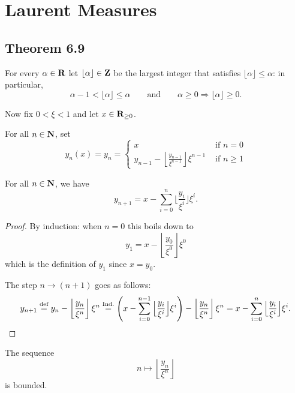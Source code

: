\section{Laurent Measures}
\subsection{Theorem 6.9}

For every $\alpha\in\mathbf{R}$ let $\lfloor \alpha\rfloor\in\mathbf{Z}$ be the largest integer that satisfies $\lfloor \alpha\rfloor\le \alpha$: in particular,
\[
	\alpha-1 < \lfloor \alpha\rfloor\le \alpha
	\qquad\text{and}\qquad
	\alpha\geq 0 \Longrightarrow \lfloor \alpha\rfloor \geq 0.
\]

Now fix $0< \xi<1$ and let $x\in\mathbf{R}_{\geq 0}$. 

\begin{definition}
\label{def:sequence_y}
	For all $n\in\mathbf{N}$, set
	\[
		y_n(x)=y_n=
		\begin{cases}
			x&\text{ if } n = 0 \\
			y_{n-1} - \left\lfloor \frac{y_{n-1}}{\xi^{n-1}} \right\rfloor \xi^{n-1} & \text{ if } n \ge 1
		\end{cases}
	\]
\end{definition}

\begin{lemma}
\label{lemma:finite_sum}
For all $n\in\mathbf{N}$, we have
       \[
	       y_{n+1} = x - \sum_{i=0}^n \Big\lfloor \frac{y_i}{\xi^i} \Big\rfloor \xi^i.
       \]
\end{lemma}

\begin{proof}
       By induction: when $n=0$ this boils down to
       \[
	       y_1=x-\left\lfloor \frac{y_0}{\xi^0}\right\rfloor \xi^0
       \]
       which is the definition of $y_1$ since $x=y_0$.

	The step $n\to (n+1)$ goes as follows:
	\[
		y_{n+1} \overset{\text{def}}{=} y_{n} - \left\lfloor \frac{y_{n}}{\xi^{n}} \right\rfloor \xi^{n}
		\overset{\text{Ind.}}{=} \left(x - \sum_{i=0}^{n-1} \Big\lfloor \frac{y_i}{\xi^i} \Big\rfloor\xi^i\right) -
		\left\lfloor \frac{y_{n}}{\xi^{n}} \right\rfloor\xi^{n}
		= x - \sum_{i=0}^n \Big\lfloor \frac{y_i}{\xi^i} \Big\rfloor \xi^i.
		\qedhere
	\]
\end{proof}

\begin{lemma}
\label{lemma:bounded}
	The sequence
	\[
		n \mapsto \left\lfloor \frac{y_n}{\xi^n} \right\rfloor
	\]
	is bounded.
\end{lemma}

